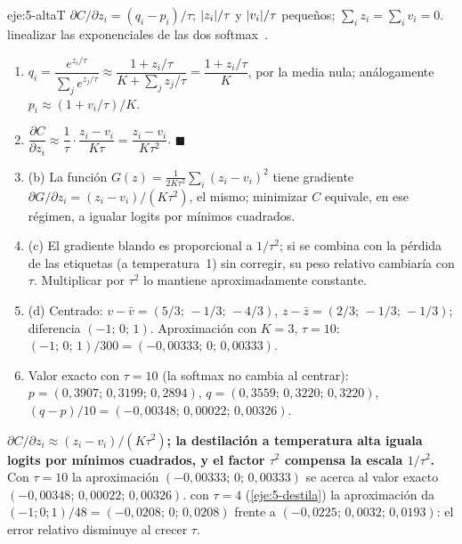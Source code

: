 \begin{solucion}{eje:5-altaT}
\datos $\partial C/\partial z_i=(q_i-p_i)/\tau$; $\lvert z_i\rvert/\tau$ y $\lvert v_i\rvert/\tau$ pequeños; $\sum_iz_i=\sum_iv_i=0$.
\planteamiento linealizar las exponenciales de las dos softmax~\cite[§2.1]{hinton}.
\pasos
\begin{enumerate}[label=\arabic*.]
  \item $q_i=\dfrac{e^{z_i/\tau}}{\sum_je^{z_j/\tau}}\approx\dfrac{1+z_i/\tau}{K+\sum_jz_j/\tau}=\dfrac{1+z_i/\tau}{K}$, por la media nula; análogamente $p_i\approx(1+v_i/\tau)/K$.
  \item $\dfrac{\partial C}{\partial z_i}\approx\dfrac{1}{\tau}\cdot\dfrac{z_i-v_i}{K\tau}=\dfrac{z_i-v_i}{K\tau^{2}}$. \hfill$\blacksquare$
  \item (b) La función $G(z)=\frac{1}{2K\tau^{2}}\sum_i(z_i-v_i)^{2}$ tiene gradiente $\partial G/\partial z_i=(z_i-v_i)/(K\tau^{2})$, el mismo; minimizar $C$ equivale, en ese régimen, a igualar logits por mínimos cuadrados.
  \item (c) El gradiente blando es proporcional a $1/\tau^{2}$; si se combina con la pérdida de las etiquetas (a temperatura~1) sin corregir, su peso relativo cambiaría con $\tau$. Multiplicar por $\tau^{2}$ lo mantiene aproximadamente constante.
  \item (d) Centrado: $v-\bar v=(5/3;\allowbreak\,-1/3;\allowbreak\,-4/3)$, $z-\bar z=(2/3;\allowbreak\,-1/3;\allowbreak\,-1/3)$; diferencia $(-1;\allowbreak\,0;\allowbreak\,1)$. Aproximación con $K=3$, $\tau=10$: $(-1;\allowbreak\,0;\allowbreak\,1)/300=(-0{,}00333;\allowbreak\,0;\allowbreak\,0{,}00333)$.
  \item Valor exacto con $\tau=10$ (la softmax no cambia al centrar): $p=(0{,}3907;\allowbreak\,0{,}3199;\allowbreak\,0{,}2894)$, $q=(0{,}3559;\allowbreak\,0{,}3220;\allowbreak\,0{,}3220)$, $(q-p)/10=(-0{,}00348;\allowbreak\,0{,}00022;\allowbreak\,0{,}00326)$.
\end{enumerate}
\resultado \textbf{$\partial C/\partial z_i\approx(z_i-v_i)/(K\tau^{2})$; la destilación a temperatura alta iguala logits por mínimos cuadrados, y el factor $\tau^{2}$ compensa la escala $1/\tau^{2}$.} Con $\tau=10$ la aproximación $(-0{,}00333;\allowbreak\,0;\allowbreak\,0{,}00333)$ se acerca al valor exacto $(-0{,}00348;\allowbreak\,0{,}00022;\allowbreak\,0{,}00326)$.
\comprobacion con $\tau=4$ (\cref{eje:5-destila}) la aproximación da $(-1;0;1)/48=(-0{,}0208;\allowbreak\,0;\allowbreak\,0{,}0208)$ frente a $(-0{,}0225;\allowbreak\,0{,}0032;\allowbreak\,0{,}0193)$: el error relativo disminuye al crecer $\tau$.
\end{solucion}

